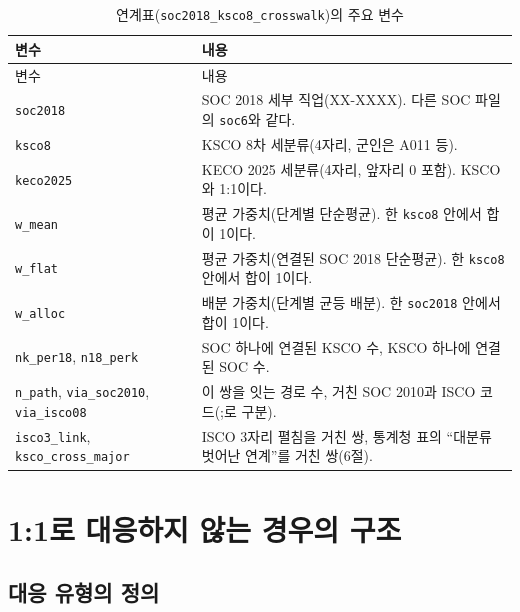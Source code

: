 \documentclass[11pt]{article}
\begin{document}
\begin{longtable}{L{3.2cm}L{13.0cm}}
\caption{연계표(\texttt{soc2018\_ksco8\_crosswalk})의 주요 변수}\label{tab:vars}\\
\toprule
변수 & 내용 \\
\midrule
\endfirsthead
\toprule
변수 & 내용 \\
\midrule
\endhead
\texttt{soc2018} & SOC 2018 세부 직업(XX-XXXX). 다른 SOC 파일의 \texttt{soc6}와 같다. \\
\texttt{ksco8} & KSCO 8차 세분류(4자리, 군인은 A011 등). \\
\texttt{keco2025} & KECO 2025 세분류(4자리, 앞자리 0 포함). KSCO와 1:1이다. \\
\texttt{w\_mean} & 평균 가중치(단계별 단순평균). 한 \texttt{ksco8} 안에서 합이 1이다. \\
\texttt{w\_flat} & 평균 가중치(연결된 SOC 2018 단순평균). 한 \texttt{ksco8} 안에서 합이 1이다. \\
\texttt{w\_alloc} & 배분 가중치(단계별 균등 배분). 한 \texttt{soc2018} 안에서 합이 1이다. \\
\texttt{nk\_per18}, \texttt{n18\_perk} & SOC 하나에 연결된 KSCO 수, KSCO 하나에 연결된 SOC 수. \\
\texttt{n\_path}, \texttt{via\_soc2010}, \texttt{via\_isco08} & 이 쌍을 잇는 경로 수, 거친 SOC 2010과 ISCO 코드(;로 구분). \\
\texttt{isco3\_link}, \texttt{ksco\_cross\_major} & ISCO 3자리 펼침을 거친 쌍, 통계청 표의 ``대분류 벗어난 연계''를 거친 쌍(6절). \\
\bottomrule
\end{longtable}

\section{1:1로 대응하지 않는 경우의 구조}

\subsection{대응 유형의 정의}
\end{document}
